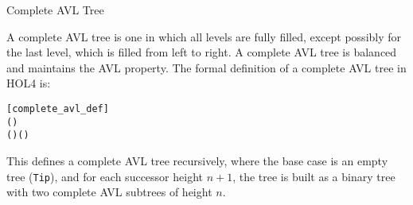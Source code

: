 \begin{defn}{Complete AVL Tree}

A complete AVL tree is one in which all levels are fully filled, except possibly for the last level, which is filled from left to right. A complete AVL tree is balanced and maintains the AVL property. The formal definition of a complete AVL tree in HOL4 is:

\begin{alltt}
	[complete_avl_def]
	  \HOLTokenDefEquality{} 
 ( ) \HOLTokenDefEquality{}
      ( ) ( )
\end{alltt}

This defines a complete AVL tree recursively, where the base case is an empty tree (\texttt{Tip}), and for each successor height \(n+1\), the tree is built as a binary tree with two complete AVL subtrees of height \(n\).
\end{defn}



